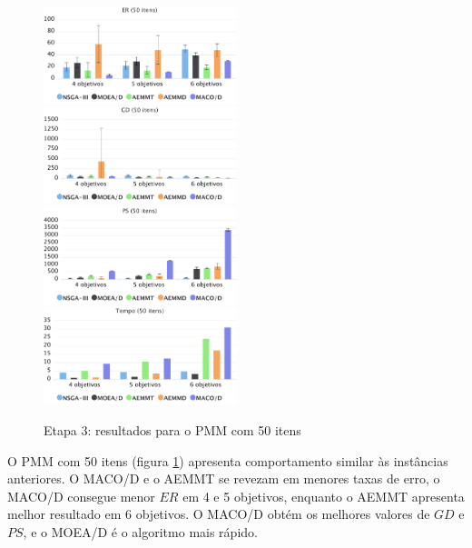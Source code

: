\begin{figure}[!htbp]
	\caption{Etapa 3: resultados para o PMM com 50 itens}
	\label{fig_exp3_pmm_50}
	\includegraphics[width=0.5\textwidth]{cap_experimentos/figs/etapa3/er-mkp-50}
	\includegraphics[width=0.5\textwidth]{cap_experimentos/figs/etapa3/gd-mkp-50}
	\includegraphics[width=0.5\textwidth]{cap_experimentos/figs/etapa3/ps-mkp-50}
	\includegraphics[width=0.5\textwidth]{cap_experimentos/figs/etapa3/time-mkp-50}
\end{figure}

O PMM com 50 itens (figura \ref{fig_exp3_pmm_50}) apresenta comportamento similar às instâncias anteriores. O MACO/D e o AEMMT se revezam em menores taxas de erro, o MACO/D consegue menor $ER$ em 4 e 5 objetivos, enquanto o AEMMT apresenta melhor resultado em 6 objetivos. O MACO/D obtém os melhores valores de $GD$ e $PS$, e o MOEA/D é o algoritmo mais rápido.

